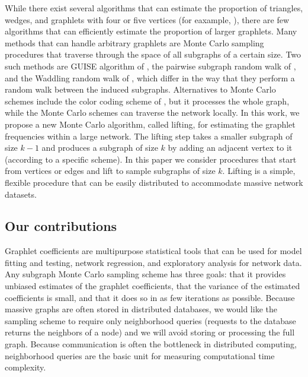 	While there exist several algorithms that can estimate the proportion of triangles, wedges, and graphlets with four or five vertices (for eaxample, \cite{Ahmed2017count, rahman2014graft}), there are few algorithms that can efficiently estimate the proportion of larger graphlets.
	Many methods that can handle arbitrary graphlets are Monte Carlo sampling procedures that traverse through the space of all subgraphs of a certain size.
	Two such methods are GUISE algorithm of \cite{bhuiyan2012guise}, the pairwise subgraph random walk of \cite{Wang2014psrw}, and the Waddling random walk of \cite{Han2016waddling}, which differ in the way that they perform a random walk between the induced subgraphs.
	Alternatives to Monte Carlo schemes include the color coding scheme of \cite{Bressan2017colourcoding}, but it processes the whole graph, while the Monte Carlo schemes can traverse the network locally.
    In this work, we propose a new Monte Carlo algorithm, called lifting, for estimating the graphlet frequencies within a large network.
    The lifting step takes a smaller subgraph of size $k-1$ and produces a subgraph of size $k$ by adding an adjacent vertex to it (according to a specific scheme).  
    In this paper we consider procedures that start from vertices or edges and lift to sample subgraphs of size $k$.
	Lifting is a simple, flexible procedure that can be easily distributed to accommodate massive network datasets.
	
	\subsection{Our contributions}
	
	Graphlet coefficients are multipurpose statistical tools that can be used for model fitting and testing, network regression, and exploratory analysis for network data.
    Any subgraph Monte Carlo sampling scheme has three goals: that it provides unbiased estimates of the graphlet coefficients, that the variance of the estimated coefficients is small, and that it does so in as few iterations as possible.
    Because massive graphs are often stored in distributed databases, we would like the sampling scheme to require only neighborhood queries (requests to the database returns the neighbors of a node) and we will avoid storing or processing the full graph.
    Because communication is often the bottleneck in distributed computing, neighborhood queries are the basic unit for measuring computational time complexity.
    
